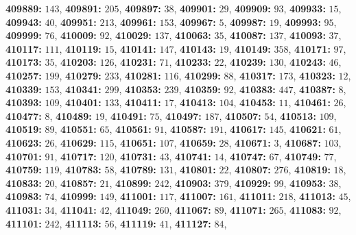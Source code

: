 \textsf{\bfseries 409889:} $143$, \textsf{\bfseries 409891:} $205$, \textsf{\bfseries 409897:} $38$, \textsf{\bfseries 409901:} $29$, \textsf{\bfseries 409909:} $93$, \textsf{\bfseries 409933:} $15$, \textsf{\bfseries 409943:} $40$, \textsf{\bfseries 409951:} $213$, \textsf{\bfseries 409961:} $153$, \textsf{\bfseries 409967:} $5$, \textsf{\bfseries 409987:} $19$, \textsf{\bfseries 409993:} $95$, \textsf{\bfseries 409999:} $76$, \textsf{\bfseries 410009:} $92$, \textsf{\bfseries 410029:} $137$, \textsf{\bfseries 410063:} $35$, \textsf{\bfseries 410087:} $137$, \textsf{\bfseries 410093:} $37$, \textsf{\bfseries 410117:} $111$, \textsf{\bfseries 410119:} $15$, \textsf{\bfseries 410141:} $147$, \textsf{\bfseries 410143:} $19$, \textsf{\bfseries 410149:} $358$, \textsf{\bfseries 410171:} $97$, \textsf{\bfseries 410173:} $35$, \textsf{\bfseries 410203:} $126$, \textsf{\bfseries 410231:} $71$, \textsf{\bfseries 410233:} $22$, \textsf{\bfseries 410239:} $130$, \textsf{\bfseries 410243:} $46$, \textsf{\bfseries 410257:} $199$, \textsf{\bfseries 410279:} $233$, \textsf{\bfseries 410281:} $116$, \textsf{\bfseries 410299:} $88$, \textsf{\bfseries 410317:} $173$, \textsf{\bfseries 410323:} $12$, \textsf{\bfseries 410339:} $153$, \textsf{\bfseries 410341:} $299$, \textsf{\bfseries 410353:} $239$, \textsf{\bfseries 410359:} $92$, \textsf{\bfseries 410383:} $447$, \textsf{\bfseries 410387:} $8$, \textsf{\bfseries 410393:} $109$, \textsf{\bfseries 410401:} $133$, \textsf{\bfseries 410411:} $17$, \textsf{\bfseries 410413:} $104$, \textsf{\bfseries 410453:} $11$, \textsf{\bfseries 410461:} $26$, \textsf{\bfseries 410477:} $8$, \textsf{\bfseries 410489:} $19$, \textsf{\bfseries 410491:} $75$, \textsf{\bfseries 410497:} $187$, \textsf{\bfseries 410507:} $54$, \textsf{\bfseries 410513:} $109$, \textsf{\bfseries 410519:} $89$, \textsf{\bfseries 410551:} $65$, \textsf{\bfseries 410561:} $91$, \textsf{\bfseries 410587:} $191$, \textsf{\bfseries 410617:} $145$, \textsf{\bfseries 410621:} $61$, \textsf{\bfseries 410623:} $26$, \textsf{\bfseries 410629:} $115$, \textsf{\bfseries 410651:} $107$, \textsf{\bfseries 410659:} $28$, \textsf{\bfseries 410671:} $3$, \textsf{\bfseries 410687:} $103$, \textsf{\bfseries 410701:} $91$, \textsf{\bfseries 410717:} $120$, \textsf{\bfseries 410731:} $43$, \textsf{\bfseries 410741:} $14$, \textsf{\bfseries 410747:} $67$, \textsf{\bfseries 410749:} $77$, \textsf{\bfseries 410759:} $119$, \textsf{\bfseries 410783:} $58$, \textsf{\bfseries 410789:} $131$, \textsf{\bfseries 410801:} $22$, \textsf{\bfseries 410807:} $276$, \textsf{\bfseries 410819:} $18$, \textsf{\bfseries 410833:} $20$, \textsf{\bfseries 410857:} $21$, \textsf{\bfseries 410899:} $242$, \textsf{\bfseries 410903:} $379$, \textsf{\bfseries 410929:} $99$, \textsf{\bfseries 410953:} $38$, \textsf{\bfseries 410983:} $74$, \textsf{\bfseries 410999:} $149$, \textsf{\bfseries 411001:} $117$, \textsf{\bfseries 411007:} $161$, \textsf{\bfseries 411011:} $218$, \textsf{\bfseries 411013:} $45$, \textsf{\bfseries 411031:} $34$, \textsf{\bfseries 411041:} $42$, \textsf{\bfseries 411049:} $260$, \textsf{\bfseries 411067:} $89$, \textsf{\bfseries 411071:} $265$, \textsf{\bfseries 411083:} $92$, \textsf{\bfseries 411101:} $242$, \textsf{\bfseries 411113:} $56$, \textsf{\bfseries 411119:} $41$, \textsf{\bfseries 411127:} $84$, 

